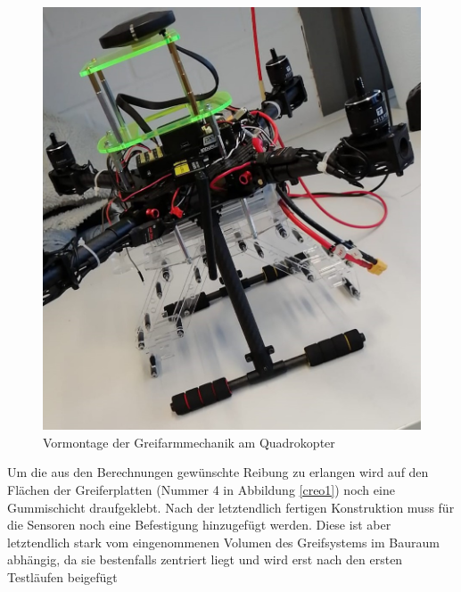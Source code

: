 \begin{figure}[h]
\begin{center}
\includegraphics[scale=0.4]{Grafiken/Fotoquadrokopter.jpg}
\caption{Vormontage der Greifarmmechanik am Quadrokopter}
\label{vormontage}
\end{center}
\end{figure}
Um die aus den Berechnungen gewünschte Reibung zu erlangen wird auf den Flächen der Greiferplatten (Nummer 4 in Abbildung \ref{creo1}) noch eine Gummischicht draufgeklebt.
Nach der letztendlich fertigen Konstruktion muss für die Sensoren noch eine Befestigung hinzugefügt werden. Diese ist aber letztendlich stark vom eingenommenen Volumen des Greifsystems im Bauraum abhängig, da sie bestenfalls zentriert liegt und wird erst nach den ersten Testläufen beigefügt

